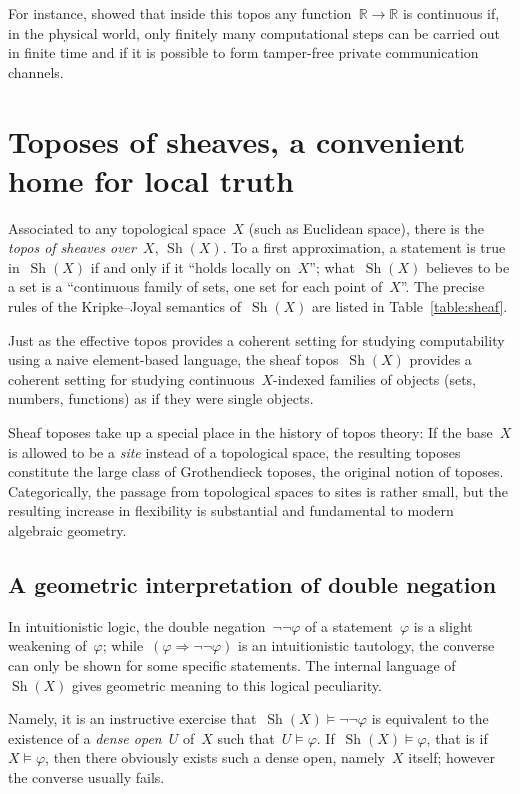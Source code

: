\documentclass[graybox]{svmult}
\newcommand{\RR}{\mathbb{R}}
\DeclareMathOperator{\Sh}{Sh}
\renewcommand{\_}{\mathpunct{.}\,}
\newcommand{\effective}{ef{}fective\xspace}
\newcommand{\?}{\,{:}\,}
\begin{document}
For instance, \cite{bauer:int-mathematics} showed that inside this topos any function~$\RR \to
\RR$ is continuous if, in the physical world, only finitely many computational
steps can be carried out in finite time and if it is possible to form
tamper-free private communication channels.


\section{Toposes of sheaves, a convenient home for local truth}
\label{sect:sheaf-toposes}

Associated to any topological space~$X$ (such as Euclidean space), there is the
\emph{topos of sheaves over~$X$}, $\Sh(X)$. To a first approximation, a
statement is true in~$\Sh(X)$ if and only if it ``holds locally on~$X$'';
what~$\Sh(X)$ believes to be a set is a ``continuous family of sets, one set
for each point of~$X$''. The precise rules of the Kripke--Joyal semantics
of~$\Sh(X)$ are listed in Table~\ref{table:sheaf}.

Just as the \effective topos provides a coherent setting for studying
computability using a naive element-based language, the sheaf topos~$\Sh(X)$ provides a
coherent setting for studying continuous~$X$-indexed families of objects (sets,
numbers, functions) as if they were single objects.

Sheaf toposes take up a special place in the history of topos theory: If the
base~$X$ is allowed to be a \emph{site} instead of a topological space, the
resulting toposes constitute the large class of Grothendieck toposes, the
original notion of toposes. Categorically, the passage from topological spaces
to sites is rather small, but the resulting increase in flexibility is
substantial and fundamental to modern algebraic geometry.


\subsection{A geometric interpretation of double negation}
In intuitionistic logic, the double negation~$\neg\neg\varphi$ of a
statement~$\varphi$ is a slight weakening of~$\varphi$; while~$(\varphi
\Rightarrow \neg\neg\varphi)$ is an intuitionistic tautology, the converse can
only be shown for some specific statements. The internal language of~$\Sh(X)$
gives geometric meaning to this logical peculiarity.

Namely, it is an instructive exercise that~$\Sh(X) \models \neg\neg\varphi$ is equivalent to the
existence of a \emph{dense open}~$U$ of~$X$ such that~$U \models \varphi$.
If~$\Sh(X) \models \varphi$, that is if~$X \models \varphi$, then there
obviously exists such a dense open, namely~$X$ itself; however the converse
usually fails.
\end{document}
